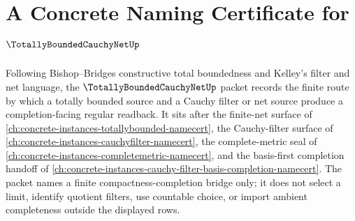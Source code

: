 \chapter{A Concrete Naming Certificate for $\TotallyBoundedCauchyNetUp$}
\label{ch:concrete-instances-totally-bounded-cauchy-net-namecert}

Following Bishop--Bridges constructive total boundedness and Kelley's filter and net language, the $\TotallyBoundedCauchyNetUp$ packet records the finite route by which a totally bounded source and a Cauchy filter or net source produce a completion-facing regular readback. It sits after the finite-net surface of \autoref{ch:concrete-instances-totallybounded-namecert}, the Cauchy-filter surface of \autoref{ch:concrete-instances-cauchyfilter-namecert}, the complete-metric seal of \autoref{ch:concrete-instances-completemetric-namecert}, and the basis-first completion handoff of \autoref{ch:concrete-instances-cauchy-filter-basis-completion-namecert}. The packet names a finite compactness-completion bridge only; it does not select a limit, identify quotient filters, use countable choice, or import ambient completeness outside the displayed rows.

